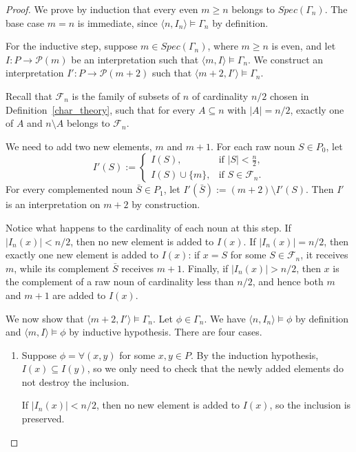 \documentclass[12pt, reqno]{amsart}
\theoremstyle{definition}
\theoremstyle{remark}
\numberwithin{equation}{section}
\begin{document}
\begin{proof}

We prove by induction that every even $m\geq n$ belongs to $Spec(\Gamma_n)$. The base case $m=n$ is immediate, since $\langle n,I_n\rangle\models\Gamma_n$ by definition.

For the inductive step, suppose $m\in Spec(\Gamma_n)$, where $m\geq n$ is even, and let $I:P\to\mathcal P(m)$ be an interpretation such that $\langle m,I\rangle\models\Gamma_n$. We construct an interpretation $I':P\to\mathcal P(m+2)$ such that $\langle m+2,I'\rangle\models\Gamma_n$.

Recall that $\mathcal F_n$ is the family of subsets of $n$ of cardinality $n/2$ chosen in Definition~\ref{char_theory}, such that for every $A\subseteq n$ with $|A|=n/2$, exactly one of $A$ and $n\setminus A$ belongs to $\mathcal F_n$.

We need to add two new elements, $m$ and $m+1$. For each raw noun $S\in P_0$, let
\[
I'(S)\mathrel{:=}
\begin{cases}
I(S), & \text{if } |S|<\frac{n}{2},\\[2mm]
I(S)\cup\{m\}, & \text{if } S\in\mathcal F_n.
\end{cases}
\]
For every complemented noun $\bar S\in P_1$, let $I'(\bar S)\mathrel{:=}(m+2)\setminus I'(S)$. Then $I'$ is an interpretation on $m+2$ by construction.

Notice what happens to the cardinality of each noun at this step. If $|I_n(x)|<n/2$, then no new element is added to $I(x)$. If $|I_n(x)|=n/2$, then exactly one new element is added to $I(x)$: if $x=S$ for some $S\in\mathcal F_n$, it receives $m$, while its complement $\bar S$ receives $m+1$. Finally, if $|I_n(x)|>n/2$, then $x$ is the complement of a raw noun of cardinality less than $n/2$, and hence both $m$ and $m+1$ are added to $I(x)$.

We now show that $\langle m+2,I'\rangle\models\Gamma_n$. Let $\phi\in\Gamma_n$. We have $\langle n,I_n\rangle\models\phi$ by definition and $\langle m,I\rangle\models\phi$ by inductive hypothesis. There are four cases.

\begin{enumerate}
	\item Suppose $\phi=\forall(x,y)$ for some $x,y\in P$. By the induction hypothesis, $I(x)\subseteq I(y)$, so we only need to check that the newly added elements do not destroy the inclusion.

	If $|I_n(x)|<n/2$, then no new element is added to $I(x)$, so the inclusion is preserved.


\end{enumerate}
\end{proof}
\end{document}
